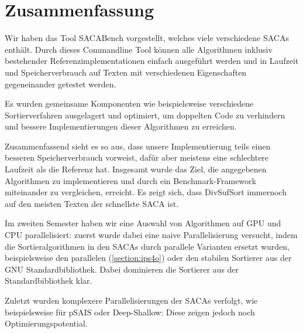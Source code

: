 \section{Zusammenfassung}

Wir  haben das Tool SACABench vorgestellt, welches viele verschiedene SACAs enthält.
Durch dieses Commandline Tool können alle Algorithmen inklusiv bestehender Referenzimplementationen einfach ausgeführt werden
und in Laufzeit und Speicherverbrauch auf Texten mit verschiedenen Eigenschaften gegeneinander getestet werden.

Es wurden gemeinsame Komponenten wie beispielsweise verschiedene Sortierverfahren ausgelagert und optimiert,
um doppelten Code zu verhindern und bessere Implementierungen dieser Algorithmen zu erreichen.

Zusammenfassend sieht es so aus, dass unsere Implementierung teils einen besseren Speicherverbrauch vorweist,
dafür aber meistens eine schlechtere Laufzeit als die Referenz hat.
Insgesamt wurde das Ziel, die angegebenen Algorithmen zu implementieren und
durch ein Benchmark-Framework miteinander zu vergleichen, erreicht.
Es zeigt sich, dass DivSufSort immernoch auf den meisten Texten der schnellste SACA ist.

Im zweiten Semester haben wir eine Auswahl von Algorithmen auf GPU und CPU parallelisiert:
zuerst wurde dabei eine naive Parallelisierung versucht, indem die Sortieralgorithmen in den SACAs durch
parallele Varianten ersetzt wurden, beispielsweise den parallelen \ipsviero (\cref{section:ips4o}) oder
den stabilen Sortierer aus der GNU Standardbibliothek.
Dabei dominieren die Sortierer aus der Standardbibliothek klar.

Zuletzt wurden komplexere Parallelisierungen der SACAs verfolgt, wie beispielsweise für pSAIS
oder Deep-Shallow:
Diese zeigen jedoch noch Optimierungspotential.
